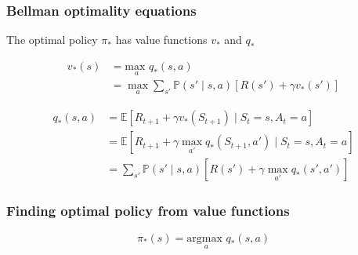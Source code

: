 \documentclass[dvipsnames,svgnames]{beamer}
\begin{document}

\begin{frame}
\frametitle{Bellman optimality equations}

The optimal policy $\pi_{*}$ has value functions  $v_*$ and $q_*$

\begin{block}{}

\begin{equation*}
\begin{split}
v_{*}(s)&=\underset{a}{\text{max }} q_{*}(s,a)
\\&=\max_{a} \sum_{s'}\mathbb{P}(s'\mid s,a)[R(s')+\gamma v_{*}(s')]
\end{split}
\end{equation*}
\end{block}

\begin{block}{}
\begin{equation*}
\begin{split}
q_{*}(s,a)&=\mathbb{E}\left[ R_{t+1} + \gamma v_{*}(S_ {t+1}) \mid S_t = s, A_t = a \right]
\\&=\mathbb{E}\left[ R_{t+1} + \gamma \max_{a'} q_{*}(S_{t+1},a') \mid S_t = s, A_t = a \right]
\\&= \sum_{s'}\mathbb{P}(s' \mid s,a)[R(s')+\gamma \max_{a'}q_{*}(s',a')]
\end{split}
\end{equation*}
\end{block}

\end{frame}


\begin{frame}
\frametitle{Finding optimal policy from value functions}
\begin{block}{}

$$\pi_{*}(s)= \underset{a}{\text{argmax }}q_*(s,a)$$
\end{block}
\end{frame}
\end{document}
